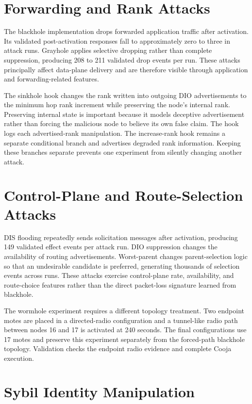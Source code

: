 \section{Forwarding and Rank Attacks}

The blackhole implementation drops forwarded application traffic after activation. Its validated post-activation responses fall to approximately zero to three in attack runs. Grayhole applies selective dropping rather than complete suppression, producing 208 to 211 validated drop events per run. These attacks principally affect data-plane delivery and are therefore visible through application and forwarding-related features.

The sinkhole hook changes the rank written into outgoing DIO advertisements to the minimum hop rank increment while preserving the node's internal rank. Preserving internal state is important because it models deceptive advertisement rather than forcing the malicious node to believe its own false claim. The hook logs each advertised-rank manipulation. The increase-rank hook remains a separate conditional branch and advertises degraded rank information. Keeping these branches separate prevents one experiment from silently changing another attack.

\section{Control-Plane and Route-Selection Attacks}

DIS flooding repeatedly sends solicitation messages after activation, producing 149 validated effect events per attack run. DIO suppression changes the availability of routing advertisements. Worst-parent changes parent-selection logic so that an undesirable candidate is preferred, generating thousands of selection events across runs. These attacks exercise control-plane rate, availability, and route-choice features rather than the direct packet-loss signature learned from blackhole.

The wormhole experiment requires a different topology treatment. Two endpoint motes are placed in a directed-radio configuration and a tunnel-like radio path between nodes 16 and 17 is activated at 240 seconds. The final configurations use 17 motes and preserve this experiment separately from the forced-path blackhole topology. Validation checks the endpoint radio evidence and complete Cooja execution.

\section{Sybil Identity Manipulation}

